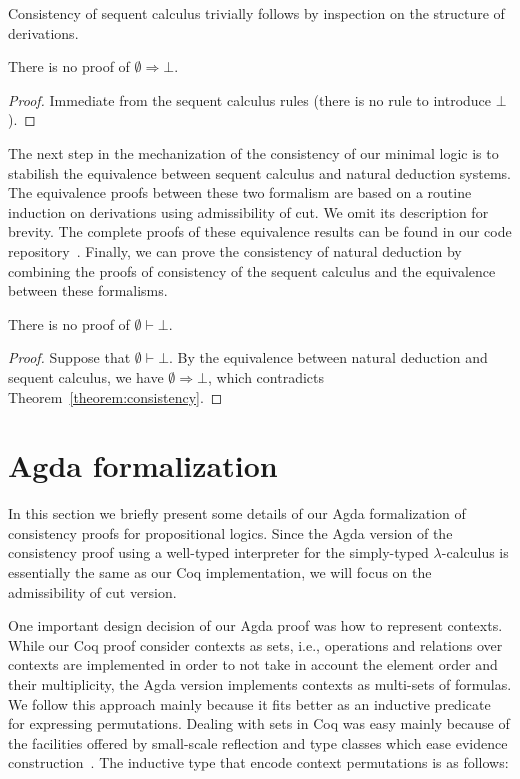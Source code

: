 Consistency of sequent calculus trivially follows by inspection on the structure of
derivations.

\begin{Theorem}\label{theorem:consistency}
  There is no proof of $\emptyset \Rightarrow \bot$.
\end{Theorem}
\begin{proof}
  Immediate from the sequent calculus rules (there is no rule to introduce $\bot$).
\end{proof}



The next step in the mechanization of the
consistency of our minimal logic is to stabilish the equivalence between sequent
calculus and natural deduction systems. The equivalence proofs between these two
formalism are based on a routine induction on derivations using admissibility of
cut. We omit its description for brevity. The complete proofs of these
equivalence results can be found in our code repository~\cite{Sasdelli20}. 
Finally, we can prove the consistency of natural deduction by combining the
proofs of consistency of the sequent calculus and the equivalence between these
formalisms.

\begin{Theorem}
  There is no proof of $\emptyset \vdash \bot$.
\end{Theorem}
\begin{proof}
  Suppose that $\emptyset \vdash \bot$. By the equivalence between natural
  deduction and sequent calculus, we have $\emptyset\Rightarrow \bot$, which
  contradicts Theorem~\ref{theorem:consistency}.
\end{proof}  



\section{Agda formalization}\label{sec:agda}


In this section we briefly present some details of our Agda formalization
of consistency proofs for propositional logics. Since the Agda version of the
consistency proof using a well-typed interpreter for the simply-typed
$\lambda$-calculus is essentially the same as our Coq implementation, we will focus
on the admissibility of cut version.


One important design decision of our Agda proof was how to represent contexts. While
our Coq proof consider contexts as sets, i.e., operations and relations over contexts
are implemented in order to not take in account the element order and their multiplicity,
the Agda version implements contexts as multi-sets of formulas. We follow this approach
mainly because it fits better as an inductive predicate for expressing permutations.
Dealing with sets in Coq was easy mainly because of the facilities offered by small-scale reflection
and type classes which ease evidence construction~\cite{GonthierM10,GonthierZND11}. The inductive
type that encode context permutations is as follows:

